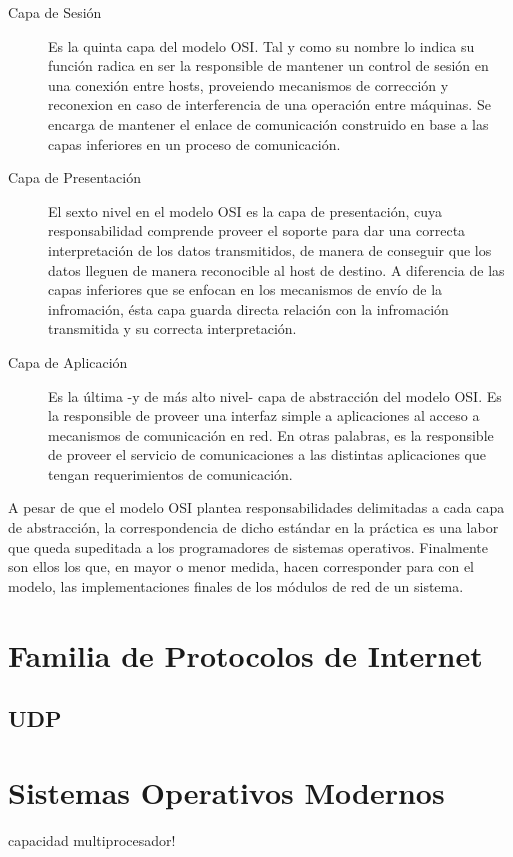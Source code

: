 \begin{description}
\item[Capa de Sesión] Es la quinta capa del modelo OSI. Tal y como su nombre lo indica su función radica en ser la responsible de mantener un control de sesión en una conexión entre hosts, proveiendo mecanismos de corrección y reconexion en caso de interferencia de una operación entre máquinas. Se encarga de mantener el enlace de comunicación construido en base a las capas inferiores en un proceso de comunicación.

\item[Capa de Presentación] El sexto nivel en el modelo OSI es la capa de presentación, cuya responsabilidad comprende proveer el soporte para dar una correcta interpretación de los datos transmitidos, de manera de conseguir que los datos lleguen de manera reconocible al host de destino. A diferencia de las capas inferiores que se enfocan en los mecanismos de envío de la infromación, ésta capa guarda directa relación con la infromación transmitida y su correcta interpretación.

\item[Capa de Aplicación] Es la última -y de más alto nivel- capa de abstracción del modelo OSI. Es la responsible de proveer una interfaz simple a aplicaciones al acceso a mecanismos de comunicación en red. En otras palabras, es la responsible de proveer el servicio de comunicaciones a las distintas aplicaciones que tengan requerimientos de comunicación.

\end{description}

A pesar de que el modelo OSI plantea responsabilidades delimitadas a cada capa de abstracción, la correspondencia de dicho estándar en la práctica es una labor que queda supeditada a los programadores de sistemas operativos. Finalmente son ellos los que, en mayor o menor medida, hacen corresponder para con el modelo, las implementaciones finales de los módulos de red de un sistema.


\section{Familia de Protocolos de Internet}

\subsection{UDP}

\section{Sistemas Operativos Modernos}
capacidad multiprocesador!

